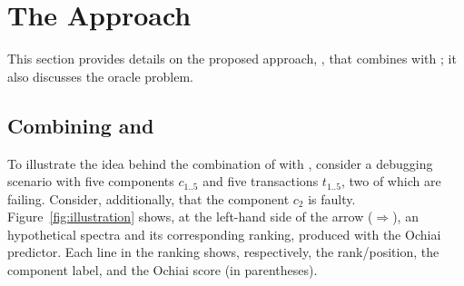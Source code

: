 \documentclass{article}
\begin{document}
\section{The \comb{} Approach}
\label{sec:approach}

This section provides details on the proposed approach, \combpar{}, that combines
\ds{} with \sfl{}; it also discusses the oracle problem.

\subsection{Combining \ds{} and \sfl{}}
\label{sec:comb}

To illustrate the idea behind the combination of \sfl{} with \ds{}, consider a
debugging scenario with five components $c_{1..5}$ and five
transactions $t_{1..5}$, two of which are failing. Consider,
additionally, that the component $c_2$ is faulty.
Figure~\ref{fig:illustration} shows, at the left-hand side of the
arrow ($\Rightarrow$), an hypothetical spectra and its corresponding
ranking, produced with the Ochiai predictor. Each line in the ranking
shows, respectively, the rank/position, the component label, and the
Ochiai score (in parentheses).
\end{document}
